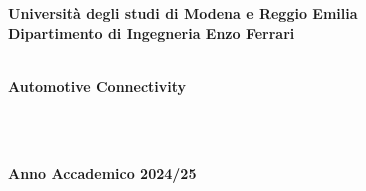 \documentclass[12pt,a4paper,oneside,onecolumn,openright]{book}
\begin{document}
\begin{titlepage}
\begin{center}
{
    \large
    \textbf{Università  degli studi di Modena e Reggio Emilia} \\
   	\textbf{Dipartimento di Ingegneria Enzo Ferrari} \\
    \hspace*{0cm} \hrulefill \hspace*{0cm} \\
  
  
 		\huge{\bf Automotive Connectivity }}\\
		\vspace{3mm}
		
		\end{center}
		
\vspace{40mm}
\par
\noindent
\vspace{20mm}
\begin{center}
\hspace*{0cm} \hrulefill \hspace*{0cm} \\
{\large{\bf 
Anno Accademico 2024/25}}
\end{center}

\end{titlepage}

\pagestyle{frontmatter}
\frontmatter

\setcounter{tocdepth}{2}
\tableofcontents

\setlength{\parindent}{12pt}
\setlength{\parskip}{1ex plus 0.5ex minus 0.2ex}
\mainmatter
\pagestyle{mainmatter}










\begin{flushleft}

 
\end{flushleft}
\end{document}
